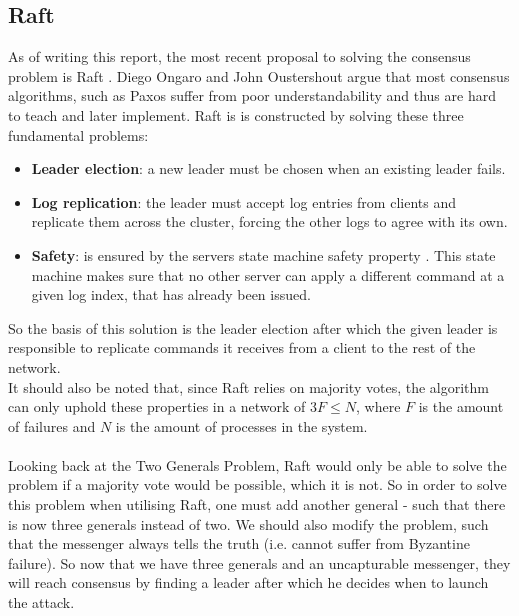 \subsection{Raft}
As of writing this report, the most recent proposal to solving the consensus problem is Raft \cite{Raft}. Diego Ongaro and John Oustershout argue that most consensus algorithms, such as Paxos \cite{Paxos} suffer from poor understandability and thus are hard to teach and later implement. Raft is is constructed by solving these three fundamental problems:
\begin{itemize}
\item \textbf{Leader election}: a new leader must be chosen when an existing leader fails.
\item \textbf{Log replication}: the leader must accept log entries from clients and replicate them across the cluster, forcing the other logs to agree with its own.\cite{Raft}
\item \textbf{Safety}: is ensured by the servers state machine safety property \cite{Raft}. This state machine makes sure that no other server can apply a different command at a given log index, that has already been issued.
\end{itemize}
So the basis of this solution is the leader election after which the given leader is responsible to replicate commands it receives from a client to the rest of the network. \\
It should also be noted that, since Raft relies on majority votes, the algorithm can only uphold these properties in a network of $3F \leq N$, where $F$ is the amount of failures and $N$ is the amount of processes in the system.
\\ \\
Looking back at the Two Generals Problem, Raft would only be able to solve the problem if a majority vote would be possible, which it is not. So in order to solve this problem when utilising Raft, one must add another general - such that there is now three generals instead of two. We should also modify the problem, such that the messenger always tells the truth (i.e. cannot suffer from Byzantine failure). So now that we have three generals and an uncapturable messenger, they will reach consensus by finding a leader after which he decides when to launch the attack.


